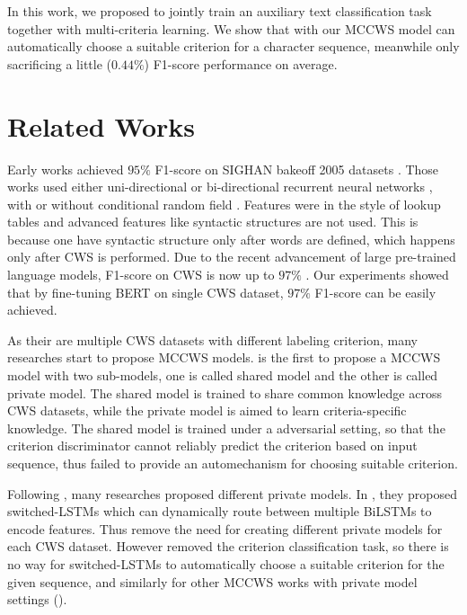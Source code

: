 \documentclass[11pt]{article}
\begin{document}
In this work, we proposed to jointly train an auxiliary text classification task together with multi-criteria learning.
We show that with our MCCWS model can automatically choose a suitable criterion for a character sequence, meanwhile only sacrificing a little (\(0.44\%\)) F1-score performance on average.

\section{Related Works}\label{sec:related}

Early works achieved \(95\%\) F1-score on SIGHAN bakeoff 2005 datasets \cite{emerson-2005-second}.
Those works used either uni-directional or bi-directional recurrent neural networks \citep{Schuster-1997-bidirectional,graves-2005-framewise}, with or without conditional random field \citep{chen-etal-2017-adversarial,ma-etal-2018-state,He-2019-effective}.
Features were in the style of lookup tables and advanced features like syntactic structures are not used.
This is because one have syntactic structure only after words are defined, which happens only after CWS is performed.
Due to the recent advancement of large pre-trained language models, F1-score on CWS is now up to \(97\%\) \citep{huang-etal-2020-towards,huang-etal-2020-joint-multiple,ke2020unified,qiu-etal-2020-concise,ke-etal-2021-pre,tong-etal-2022-word}.
Our experiments showed that by fine-tuning BERT \citep{devlin-etal-2019-bert} on single CWS dataset, \(97\%\) F1-score can be easily achieved.

As their are multiple CWS datasets with different labeling criterion, many researches start to propose MCCWS models.
\citep{chen-etal-2017-adversarial} is the first to propose a MCCWS model with two sub-models, one is called shared model and the other is called private model.
The shared model is trained to share common knowledge across CWS datasets, while the private model is aimed to learn criteria-specific knowledge.
The shared model is trained under a adversarial setting, so that the criterion discriminator cannot reliably predict the criterion based on input sequence, thus failed to provide an automechanism for choosing suitable criterion.

Following \citep{chen-etal-2017-adversarial}, many researches proposed different private models.
In \citep{Gong-2019-switch}, they proposed switched-LSTMs which can dynamically route between multiple BiLSTMs to encode features.
Thus remove the need for creating different private models for each CWS dataset.
However \citep{Gong-2019-switch} removed the criterion classification task, so there is no way for switched-LSTMs to automatically choose a suitable criterion for the given sequence, and similarly for other MCCWS works with private model settings (\citep{huang-etal-2020-towards,qiu-etal-2020-concise}).
\end{document}
